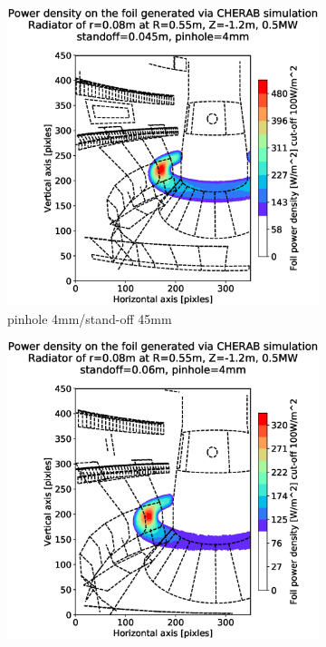 \begin{figure}
     \centering
     \begin{subfigure}{0.31\textwidth}
         \centering
         \includegraphics[trim={85 25 57 80},clip,width=\textwidth]{Chapters/chapter2/figs/measured_power_4_45radiator_R0.55_Z-1.2_r0.08.stl.eps}
         \caption{pinhole 4mm/stand-off 45mm}
         \label{fig:4_45}
     \end{subfigure}
     \hfill
     \begin{subfigure}{0.31\textwidth}
         \centering
         \includegraphics[trim={85 25 57 80},clip,width=\textwidth]{Chapters/chapter2/figs/measured_power_4_60radiator_R0.55_Z-1.2_r0.08.stl.eps}

\end{subfigure}
\end{figure}
